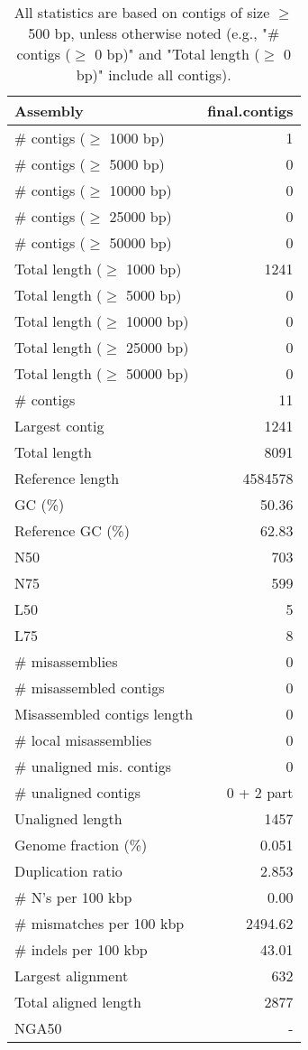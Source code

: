 \documentclass[12pt,a4paper]{article}
\begin{document}
\begin{table}[ht]
\begin{center}
\caption{All statistics are based on contigs of size $\geq$ 500 bp, unless otherwise noted (e.g., "\# contigs ($\geq$ 0 bp)" and "Total length ($\geq$ 0 bp)" include all contigs).}
\begin{tabular}{|l*{1}{|r}|}
\hline
Assembly & final.contigs \\ \hline
\# contigs ($\geq$ 1000 bp) & 1 \\ \hline
\# contigs ($\geq$ 5000 bp) & 0 \\ \hline
\# contigs ($\geq$ 10000 bp) & 0 \\ \hline
\# contigs ($\geq$ 25000 bp) & 0 \\ \hline
\# contigs ($\geq$ 50000 bp) & 0 \\ \hline
Total length ($\geq$ 1000 bp) & 1241 \\ \hline
Total length ($\geq$ 5000 bp) & 0 \\ \hline
Total length ($\geq$ 10000 bp) & 0 \\ \hline
Total length ($\geq$ 25000 bp) & 0 \\ \hline
Total length ($\geq$ 50000 bp) & 0 \\ \hline
\# contigs & 11 \\ \hline
Largest contig & 1241 \\ \hline
Total length & 8091 \\ \hline
Reference length & 4584578 \\ \hline
GC (\%) & 50.36 \\ \hline
Reference GC (\%) & 62.83 \\ \hline
N50 & 703 \\ \hline
N75 & 599 \\ \hline
L50 & 5 \\ \hline
L75 & 8 \\ \hline
\# misassemblies & 0 \\ \hline
\# misassembled contigs & 0 \\ \hline
Misassembled contigs length & 0 \\ \hline
\# local misassemblies & 0 \\ \hline
\# unaligned mis. contigs & 0 \\ \hline
\# unaligned contigs & 0 + 2 part \\ \hline
Unaligned length & 1457 \\ \hline
Genome fraction (\%) & 0.051 \\ \hline
Duplication ratio & 2.853 \\ \hline
\# N's per 100 kbp & 0.00 \\ \hline
\# mismatches per 100 kbp & 2494.62 \\ \hline
\# indels per 100 kbp & 43.01 \\ \hline
Largest alignment & 632 \\ \hline
Total aligned length & 2877 \\ \hline
NGA50 & - \\ \hline
\end{tabular}
\end{center}
\end{table}
\end{document}
